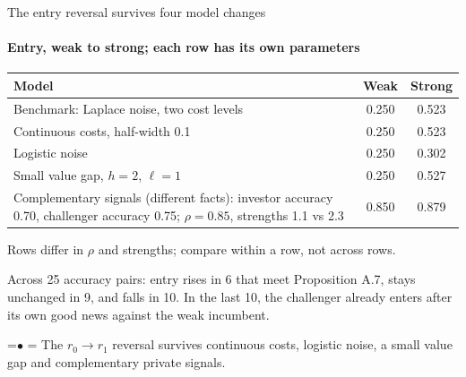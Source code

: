 \documentclass[10pt,aspectratio=169]{beamer}
\newcommand{\TakeawayBody}[1]{\begin{minipage}{\textwidth}\raggedright\normalsize
    \setbox0=\hbox{{\usebeamercolor[fg]{structure}\raise0.7pt\hbox{\scriptsize$\bullet$}}\hspace{0.55em}}%
    \hangindent=\wd0 \hangafter=1 \noindent\box0 #1\par
  \end{minipage}}
\renewcommand{\TakeawayWithNav}[2][\ExhibitReadingGap]{\par\vspace{#1}\noindent\TakeawayBody{#2}\par\vspace{0.45cm}}
\begin{document}
\begin{frame}[label=F13]{The entry reversal survives four model changes}
\framesubtitle{Entry, weak to strong; each row has its own parameters}
\hypertarget{main:robust}{}
\vspace{2pt}
\begin{center}\small
\begin{tabular}{@{}>{\raggedright\arraybackslash}p{10.4cm}cc@{}}
\toprule
Model & Weak & Strong\\
\midrule
Benchmark: Laplace noise, two cost levels & 0.250 %
 & 0.523\\ %
Continuous costs, half-width 0.1 %
 & 0.250 %
 & 0.523\\ %
Logistic noise & 0.250 %
 & 0.302\\ %
Small value gap, $h=2$, %
$\ell=1$ %
 & 0.250 %
 & 0.527\\ %
Complementary signals (different facts): investor accuracy 0.70, %
challenger accuracy 0.75; %
$\rho=0.85$, %
strengths 1.1 %
vs 2.3 %
 & 0.850 %
 & 0.879\\ %
\bottomrule
\end{tabular}
\end{center}
\vspace{-3pt}
{\color{cGrayText}\footnotesize Rows differ in $\rho$ and strengths; compare within a row, not across rows.\par
\vspace{2pt}
Across 25 accuracy pairs: entry rises in 6 that meet Proposition A.7, stays unchanged in 9, and falls in 10. In the last 10, the challenger already enters after its own good news against the weak incumbent.\par}
\TakeawayWithNav[0.5em]{The $r_0\to r_1$ reversal survives continuous costs, logistic noise, a small value gap and complementary private signals.}
\end{frame}
\end{document}
